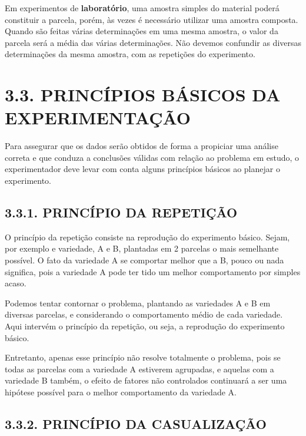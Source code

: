 \documentclass[
]{book}
\begin{document}
Em experimentos de \textbf{laboratório}, uma amostra simples do material poderá constituir a parcela, porém, às vezes é necessário utilizar uma amostra composta. Quando são feitas várias determinações em uma mesma amostra, o valor da parcela será a média das várias determinações. Não devemos confundir as diversas determinações da mesma amostra, com as repetições do experimento.

\hypertarget{princuxedpios-buxe1sicos-da-experimentauxe7uxe3o}{%
\section{3.3. PRINCÍPIOS BÁSICOS DA EXPERIMENTAÇÃO}\label{princuxedpios-buxe1sicos-da-experimentauxe7uxe3o}}

Para assegurar que os dados serão obtidos de forma a propiciar uma análise correta e que conduza a conclusões válidas com relação ao problema em estudo, o experimentador deve levar com conta alguns princípios básicos ao planejar o experimento.

\hypertarget{princuxedpio-da-repetiuxe7uxe3o}{%
\subsection{3.3.1. PRINCÍPIO DA REPETIÇÃO}\label{princuxedpio-da-repetiuxe7uxe3o}}

O princípio da repetição consiste na reprodução do experimento básico. Sejam, por exemplo e variedade, A e B, plantadas em 2 parcelas o mais semelhante possível. O fato da variedade A se comportar melhor que a B, pouco ou nada significa, pois a variedade A pode ter tido um melhor comportamento por simples acaso.

Podemos tentar contornar o problema, plantando as variedades A e B em diversas parcelas, e considerando o comportamento médio de cada variedade. Aqui intervém o princípio da repetição, ou seja, a reprodução do experimento básico.

Entretanto, apenas esse princípio não resolve totalmente o problema, pois se todas as parcelas com a variedade A estiverem agrupadas, e aquelas com a variedade B também, o efeito de fatores não controlados continuará a ser uma hipótese possível para o melhor comportamento da variedade A.

\hypertarget{princuxedpio-da-casualizauxe7uxe3o}{%
\subsection{3.3.2. PRINCÍPIO DA CASUALIZAÇÃO}\label{princuxedpio-da-casualizauxe7uxe3o}}
\end{document}
